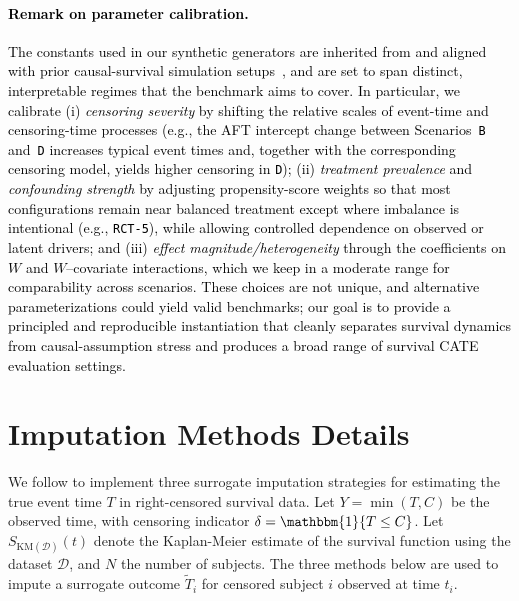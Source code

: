 \documentclass{article} %
\newcommand{\rebuttal}[1]{\textcolor{black}{#1}}
\begin{document}
\paragraph{\rebuttal{Remark on parameter calibration.}}
\rebuttal{The constants used in our synthetic generators are inherited from and aligned with prior causal-survival simulation setups~\citep{cui2023estimating, meir2025heterogeneous}, and are set to span distinct, interpretable regimes that the benchmark aims to cover. In particular, we calibrate (i) \emph{censoring severity} by shifting the relative scales of event-time and censoring-time processes (e.g., the AFT intercept change between Scenarios~\texttt{B} and~\texttt{D} increases typical event times and, together with the corresponding censoring model, yields higher censoring in \texttt{D}); (ii) \emph{treatment prevalence} and \emph{confounding strength} by adjusting propensity-score weights so that most configurations remain near balanced treatment except where imbalance is intentional (e.g., \texttt{RCT-5}), while allowing controlled dependence on observed or latent drivers; and (iii) \emph{effect magnitude/heterogeneity} through the coefficients on $W$ and $W$--covariate interactions, which we keep in a moderate range for comparability across scenarios. These choices are not unique, and alternative parameterizations could yield valid benchmarks; our goal is to provide a principled and reproducible instantiation that cleanly separates survival dynamics from causal-assumption stress and produces a broad range of survival CATE evaluation settings.}


\clearpage

\section{Imputation Methods Details} \label{app:imputation}

We follow \citet{qi2023an} to implement three surrogate imputation strategies for estimating the true event time \( T \) in right-censored survival data. Let \( Y = \min(T, C) \) be the observed time, with censoring indicator \( \delta = \mathbbm{1}\{T \leq C\} \). Let \( S_{\text{KM}(\mathcal{D})}(t) \) denote the Kaplan-Meier estimate of the survival function using the dataset \( \mathcal{D} \), and \( N \) the number of subjects. The three methods below are used to impute a surrogate outcome \( \tilde{T}_i \) for censored subject \( i \) observed at time \( t_i \).
\end{document}
